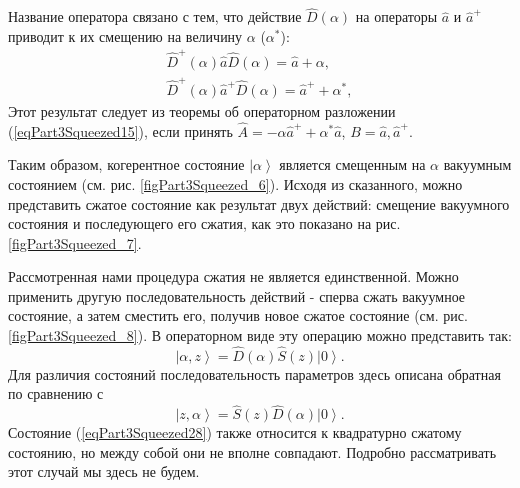 Название оператора связано с тем, что действие
$\hat{D}\left(\alpha\right)$ на операторы $\hat{a}$ и $\hat{a}^{+}$
приводит к их смещению на величину $\alpha$ ($\alpha^{*}$):
\begin{eqnarray}
\hat{D}^{+}\left(\alpha\right)\hat{a}\hat{D}\left(\alpha\right) =
\hat{a} + \alpha,
\nonumber \\
\hat{D}^{+}\left(\alpha\right)\hat{a}^{+}\hat{D}\left(\alpha\right) =
\hat{a}^{+} + \alpha^{*},
\label{eqPart3SqueezedTaskOffset}
\end{eqnarray}
Этот результат следует из теоремы об операторном разложении
(\ref{eqPart3Squeezed15}), если принять $\hat{A} = - \alpha \hat{a}^{+}
+ \alpha^{*} \hat{a}$, $B=\hat{a}, \hat{a}^{+}$.



Таким образом, когерентное состояние $\left|\alpha\right>$ является
смещенным на $\alpha$ вакуумным состоянием
(см. рис. \ref{figPart3Squeezed_6}).
Исходя из сказанного, можно представить сжатое
состояние как результат двух действий: смещение вакуумного состояния и
последующего его сжатия, как это показано на
рис. \ref{figPart3Squeezed_7}. 




Рассмотренная нами процедура сжатия не является единственной. Можно
применить другую последовательность действий - сперва сжать вакуумное
состояние, а затем сместить его, получив новое сжатое состояние
(см. рис. \ref{figPart3Squeezed_8}). В операторном виде эту операцию
можно представить так:
\begin{equation}
\left|\alpha, z\right> =
\hat{D}\left(\alpha\right)\hat{S}\left(z\right) \left|0\right>.
\label{eqPart3Squeezed28}
\end{equation}
Для различия состояний последовательность параметров здесь описана
обратная по сравнению с 
\[
\left|z,\alpha\right> =
\hat{S}\left(z\right) \hat{D}\left(\alpha\right)\left|0\right>.
\]
Состояние (\ref{eqPart3Squeezed28}) также относится к квадратурно
сжатому состоянию, но между собой они не вполне совпадают. Подробно
рассматривать этот случай мы здесь не будем.



